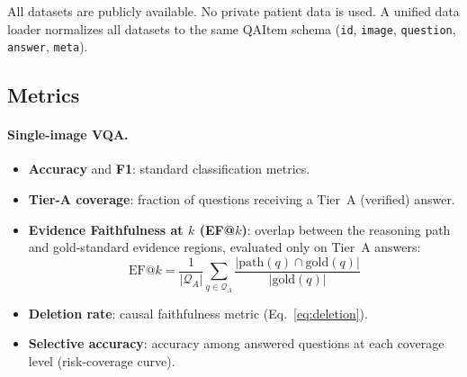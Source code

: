 \documentclass[runningheads]{llncs}
\begin{document}
\noindent
All datasets are publicly available.
No private patient data is used.
A unified data loader normalizes all datasets to the same QAItem schema
(\texttt{id}, \texttt{image}, \texttt{question}, \texttt{answer},
\texttt{meta}).

\subsection{Metrics}
\label{sec:metrics}

\paragraph{Single-image VQA.}
\begin{itemize}
  \item \textbf{Accuracy} and \textbf{F1}: standard classification metrics.
  \item \textbf{Tier-A coverage}: fraction of questions receiving a Tier~A
    (verified) answer.
  \item \textbf{Evidence Faithfulness at $k$ (EF@$k$)}: overlap between
    the reasoning path and gold-standard evidence regions, evaluated only on
    Tier~A answers:
    \begin{equation}
      \text{EF@}k = \frac{1}{|\mathcal{Q}_A|} \sum_{q \in \mathcal{Q}_A}
        \frac{|\text{path}(q) \cap \text{gold}(q)|}{|\text{gold}(q)|}
      \label{eq:efk}
    \end{equation}
  \item \textbf{Deletion rate}: causal faithfulness metric
    (Eq.~\ref{eq:deletion}).
  \item \textbf{Selective accuracy}: accuracy among answered questions at
    each coverage level (risk-coverage curve).
\end{itemize}
\end{document}
